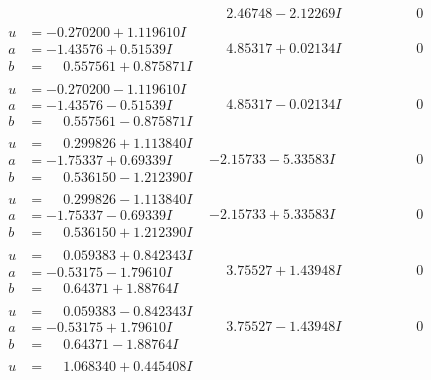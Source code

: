 \documentclass[1p]{elsarticle_modified}
\theoremstyle{definition}
\begin{document}
$$\begin{array}{c|c|c}
 & \phantom{-}2.46748 - 2.12269 I & \phantom{-0.000000 } 0 \\ \hline\begin{aligned}
u &= -0.270200 + 1.119610 I \\
a &= -1.43576 + 0.51539 I \\
b &= \phantom{-}0.557561 + 0.875871 I\end{aligned}
 & \phantom{-}4.85317 + 0.02134 I & \phantom{-0.000000 } 0 \\ \hline\begin{aligned}
u &= -0.270200 - 1.119610 I \\
a &= -1.43576 - 0.51539 I \\
b &= \phantom{-}0.557561 - 0.875871 I\end{aligned}
 & \phantom{-}4.85317 - 0.02134 I & \phantom{-0.000000 } 0 \\ \hline\begin{aligned}
u &= \phantom{-}0.299826 + 1.113840 I \\
a &= -1.75337 + 0.69339 I \\
b &= \phantom{-}0.536150 - 1.212390 I\end{aligned}
 & -2.15733 - 5.33583 I & \phantom{-0.000000 } 0 \\ \hline\begin{aligned}
u &= \phantom{-}0.299826 - 1.113840 I \\
a &= -1.75337 - 0.69339 I \\
b &= \phantom{-}0.536150 + 1.212390 I\end{aligned}
 & -2.15733 + 5.33583 I & \phantom{-0.000000 } 0 \\ \hline\begin{aligned}
u &= \phantom{-}0.059383 + 0.842343 I \\
a &= -0.53175 - 1.79610 I \\
b &= \phantom{-}0.64371 + 1.88764 I\end{aligned}
 & \phantom{-}3.75527 + 1.43948 I & \phantom{-0.000000 } 0 \\ \hline\begin{aligned}
u &= \phantom{-}0.059383 - 0.842343 I \\
a &= -0.53175 + 1.79610 I \\
b &= \phantom{-}0.64371 - 1.88764 I\end{aligned}
 & \phantom{-}3.75527 - 1.43948 I & \phantom{-0.000000 } 0 \\ \hline\begin{aligned}
u &= \phantom{-}1.068340 + 0.445408 I \\

\end{aligned}
\end{array}$$
\end{document}
